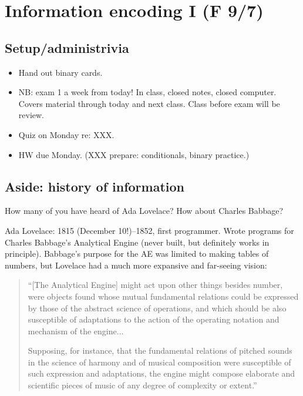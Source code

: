 \documentclass{article}
\begin{document}
\newpage

\section{Information encoding I (F 9/7)}

\subsection*{Setup/administrivia}

\begin{itemize}
\item Hand out binary cards.
\item NB: exam 1 a week from today!  In class, closed notes, closed
  computer.  Covers material through today and next class. Class
  before exam will be review.
\item Quiz on Monday re: XXX.
\item HW due Monday. (XXX prepare: conditionals, binary practice.)
\end{itemize}

\subsection*{Aside: history of information}

How many of you have heard of Ada Lovelace?  How about Charles
Babbage?

Ada Lovelace: 1815 (December 10!)--1852, first programmer.  Wrote
programs for Charles Babbage's Analytical Engine (never built, but
definitely works in principle).  Babbage's purpose for the AE was
limited to making tables of numbers, but Lovelace had a much more
expansive and far-seeing vision:

\begin{quote}
``[The Analytical Engine] might act upon other things besides number,
were objects found whose mutual fundamental relations could be
expressed by those of the abstract science of operations, and which
should be also susceptible of adaptations to the action of the
operating notation and mechanism of the engine...

Supposing, for instance, that the fundamental relations of pitched
sounds in the science of harmony and of musical composition were
susceptible of such expression and adaptations, the engine might
compose elaborate and scientific pieces of music of any degree of
complexity or extent.''
\end{quote}
\end{document}
